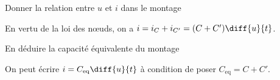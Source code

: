 


\begin{enonce}
Donner la relation entre $u$ et $i$ dans le montage \reponseB
\end{enonce}


\begin{corrige}
En vertu de la loi des n\oe uds, on a $i=i_C+i_{C'}=(C+C')\diff{u}{t}$.
\end{corrige}




\begin{enonce}
En déduire la capacité équivalente du montage \reponseB
\end{enonce}


\begin{corrige}
On peut écrire $i=C_\text{eq}\diff{u}{t}$ à condition de poser 
\(C_\text{eq}=C+C'\).
\end{corrige}


\finEntrainement



\newpage




\hauteurLargeurCadreReponse		{6mm}{2.5cm}
\initialisationEntrainement

